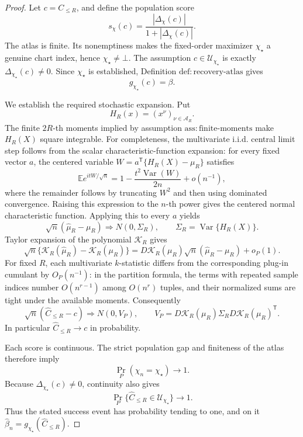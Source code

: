 \documentclass{article}
\begin{document}
\begin{proof}
Let \(c=C_{\le R}\), and define the population score
\[
 s_\chi(c)=\frac{|\Delta_\chi(c)|}{1+|\Delta_\chi(c)|}.
\]
The atlas is finite.  Its nonemptiness makes the fixed-order maximizer \(\chi_\star\) a genuine chart index, hence \(\chi_\star\ne\bot\).  The assumption \(c\in\mathcal U_{\chi_\star}\) is exactly \(\Delta_{\chi_\star}(c)\ne0\).  Since \(\chi_\star\) is established, Definition \(\mathrm{def:recovery\mbox{-}atlas}\) gives
\[
 g_{\chi_\star}(c)=\beta.
\]

We establish the required stochastic expansion.  Put
\[
 H_R(x)=(x^\nu)_{\nu\in\mathcal A_R}.
\]
The finite \(2R\)-th moments implied by assumption \(\mathrm{ass:finite\mbox{-}moments}\) make \(H_R(X)\) square integrable.  For completeness, the multivariate i.i.d. central limit step follows from the scalar characteristic-function expansion: for every fixed vector \(a\), the centered variable \(W=a^{\mathsf T}\{H_R(X)-\mu_R\}\) satisfies
\[
 \mathbb E e^{itW/\sqrt n}
 =1-\frac{t^2\operatorname{Var}(W)}{2n}+o(n^{-1}),
\]
where the remainder follows by truncating \(W^2\) and then using dominated convergence.  Raising this expression to the \(n\)-th power gives the centered normal characteristic function.  Applying this to every \(a\) yields
\[
 \sqrt n(\widehat\mu_R-\mu_R)\Rightarrow N(0,\Sigma_R),
 \qquad \Sigma_R=\operatorname{Var}\{H_R(X)\}.
\]
Taylor expansion of the polynomial \(\mathcal K_R\) gives
\[
 \sqrt n\{\mathcal K_R(\widehat\mu_R)-\mathcal K_R(\mu_R)\}
 =D\mathcal K_R(\mu_R)\sqrt n(\widehat\mu_R-\mu_R)+o_P(1).
\]
For fixed \(R\), each multivariate \(k\)-statistic differs from the corresponding plug-in cumulant by \(O_P(n^{-1})\): in the partition formula, the terms with repeated sample indices number \(O(n^{r-1})\) among \(O(n^r)\) tuples, and their normalized sums are tight under the available moments.  Consequently
\[
 \sqrt n(\widehat C_{\le R}-c)\Rightarrow N(0,V_P),
 \qquad
 V_P=D\mathcal K_R(\mu_R)\Sigma_RD\mathcal K_R(\mu_R)^{\mathsf T}.
\]
In particular \(\widehat C_{\le R}\to c\) in probability.

Each score is continuous.  The strict population gap and finiteness of the atlas therefore imply
\[
 \Pr_P(\chi_n=\chi_\star)\longrightarrow1.
\]
Because \(\Delta_{\chi_\star}(c)\ne0\), continuity also gives
\[
 \Pr_P\{\widehat C_{\le R}\in\mathcal U_{\chi_\star}\}\longrightarrow1.
\]
Thus the stated success event has probability tending to one, and on it \(\widehat\beta_n=g_{\chi_\star}(\widehat C_{\le R})\).


\end{proof}
\end{document}
